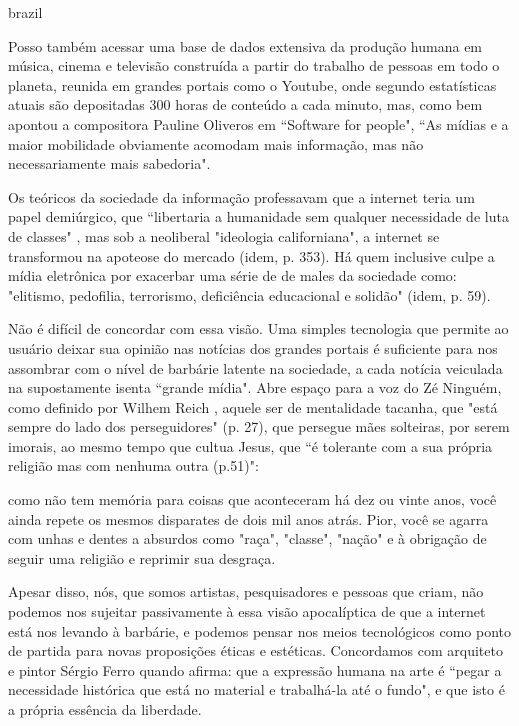 \begin{otherlanguage*}{brazil}
\begin{figure}[htb]
\end{figure}

Posso também acessar uma base de dados extensiva da produção humana em música, cinema e televisão construída a partir do trabalho de pessoas em todo o planeta, reunida em grandes portais como o Youtube, onde segundo estatísticas atuais são depositadas 300 horas de conteúdo a cada minuto, mas, como bem apontou a compositora Pauline Oliveros em ``Software for people", ``As mídias e a maior mobilidade obviamente acomodam mais informação, mas não necessariamente mais sabedoria"\cite[179]{Oliveros2012}. 

Os teóricos da sociedade da informação professavam que a internet teria um papel demiúrgico, que ``libertaria a humanidade sem qualquer necessidade de luta de classes" \cite[275]{Barbrook2009}, mas sob a neoliberal "ideologia californiana", a internet se transformou na apoteose do mercado (idem, p. 353). Há quem inclusive culpe a mídia eletrônica por exacerbar uma série de de males da sociedade como: "elitismo, pedofilia, terrorismo, deficiência educacional e solidão" (idem, p. 59). 


Não é difícil de concordar com essa visão. Uma simples tecnologia que permite ao usuário deixar sua opinião nas notícias dos grandes portais é suficiente para nos assombrar com o nível de barbárie latente na sociedade, a cada notícia veiculada na supostamente isenta ``grande mídia". Abre espaço para a voz do Zé Ninguém, como definido por Wilhem Reich \cite{reich1998escute}, aquele ser de mentalidade tacanha, que "está sempre do lado dos perseguidores" (p. 27), que persegue mães solteiras, por serem imorais, ao mesmo tempo que cultua Jesus, que ``é tolerante com a sua própria religião mas com nenhuma outra (p.51)":

\begin{citacao}
como não tem memória para coisas que aconteceram há dez ou vinte anos, você ainda repete os mesmos disparates de dois mil anos atrás. Pior, você se agarra com unhas e dentes a absurdos como "raça", "classe", "nação" e à obrigação de seguir uma religião e reprimir sua desgraça. \cite[101]{reich1998escute} 
\end{citacao}

Apesar disso, nós, que somos artistas, pesquisadores e pessoas que criam, não podemos nos sujeitar passivamente à essa visão apocalíptica de que a internet está nos levando à barbárie, e podemos pensar nos meios tecnológicos como ponto de partida para novas proposições éticas e estéticas. Concordamos com arquiteto e pintor Sérgio Ferro quando afirma: que a expressão humana na arte é ``pegar a necessidade histórica que está no material e trabalhá-la até o fundo", \cite{FerroSergio2002} e que isto é a própria essência da liberdade.


\end{otherlanguage*}
